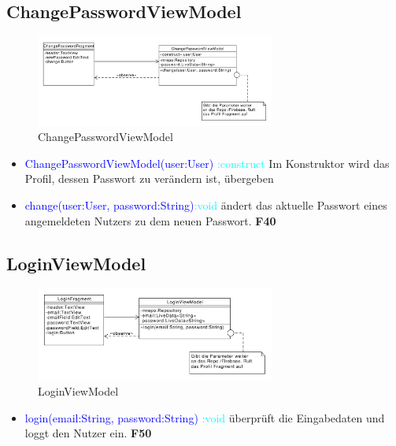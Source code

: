 \subsection{ChangePasswordViewModel}
\begin{figure}[H]
	\centering
	\includegraphics[width=0.7\textwidth]{pics/viewModel/Change_Password_ViewModel.pdf}%
	\caption{ChangePasswordViewModel}%
	\label{viewModel}%
\end{figure}
\begin{itemize}
	\item \textcolor{blue}{ChangePasswordViewModel(user:User)}
	\textcolor{cyan}{:construct} Im Konstruktor wird das Profil, dessen Passwort zu verändern ist, übergeben
	
	\item \textcolor{blue}{change(user:User, password:String)}\textcolor{cyan}{:void} ändert das aktuelle Passwort eines angemeldeten Nutzers zu dem neuen Passwort. \textbf{F40}
\end{itemize}

\subsection{LoginViewModel}
\begin{figure}[H]
	\centering
	\includegraphics[width=0.7\textwidth]{pics/viewModel/Login_ViewModel.pdf}%
	\caption{LoginViewModel}%
	\label{viewModel}%
\end{figure}
\begin{itemize}
	\item \textcolor{blue}{login(email:String, password:String)} \textcolor{cyan}{:void} überprüft die Eingabedaten und loggt den Nutzer ein. \textbf{F50}
\end{itemize}

